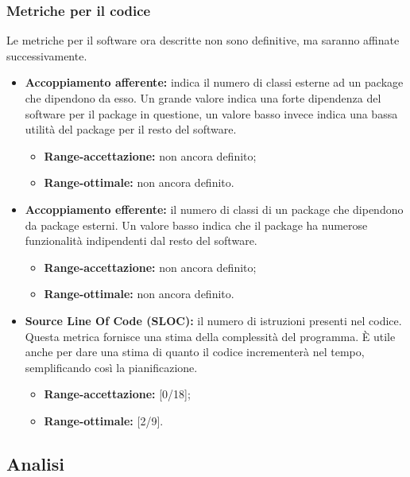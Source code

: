 	
		\subsubsection{Metriche per il codice}
		Le metriche per il software ora descritte non sono definitive, ma saranno affinate successivamente.
		
		\begin{itemize}
			\item \textbf{Accoppiamento afferente: }indica il numero di classi esterne ad un package che dipendono da esso. Un grande valore indica una forte dipendenza del software per il package in questione, un valore basso invece indica una bassa utilità del package per il resto del software.
			
			\begin{itemize}
				\item \textbf{Range-accettazione: }non ancora definito;
				\item \textbf{Range-ottimale: }non ancora definito.
			\end{itemize}
			
			\item \textbf{Accoppiamento efferente: }il numero di classi di un package che dipendono da package esterni. Un valore basso indica che il package ha numerose funzionalità indipendenti dal resto del software.
			
			\begin{itemize}
				\item \textbf{Range-accettazione: }non ancora definito;
				\item \textbf{Range-ottimale: }non ancora definito.
			\end{itemize}
			
			\item \textbf{Source Line Of Code (SLOC): }il numero di istruzioni presenti nel codice. Questa metrica fornisce una stima della complessità del programma. È utile anche per dare una stima di quanto il codice incrementerà nel tempo, semplificando così la pianificazione.
			
			\begin{itemize}
				\item \textbf{Range-accettazione: }[0/18];
				\item \textbf{Range-ottimale: }[2/9].
			\end{itemize}
			
		\end{itemize}
	
	
	\subsection{Analisi}
	
